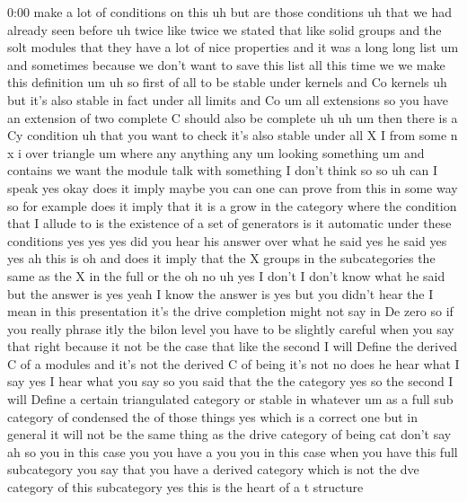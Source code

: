\begin{unfinished}{0:00}
make  a  lot  of  conditions  on  this  uh  but
are  those  conditions  uh  that  we  had
already  seen  before  uh  twice  like  twice
we  stated  that  like  solid  groups  and  the
solt  modules  that  they  have  a  lot  of
nice  properties  and  it  was  a  long  long
list  um  and  sometimes  because  we  don't
want  to  save  this  list  all  this  time  we
we  make  this  definition
um  uh  so  first  of  all  to
be  stable  under  kernels  and  Co
kernels  uh  but  it's  also  stable  in  fact
under  all  limits  and
Co  um  all  extensions  so  you  have  an
extension  of  two  complete  C  should  also
be
complete  uh
uh
um  then  there  is  a  Cy  condition  uh
that  you  want  to  check  it's  also  stable
under
all  X  I  from  some
n  x  i  over  triangle  um  where  any
anything
any
um  looking  something  um  and
contains  we  want
the  module
talk  with
something  I  don't  think
so  so  uh  can  I  speak  yes  okay  does  it
imply  maybe  you  can  one  can  prove  from
this  in  some  way  so  for  example  does  it
imply  that  it  is  a  grow  in  the  category
where  the  condition  that  I  allude  to  is
the  existence  of  a  set  of  generators  is
it  automatic  under  these  conditions  yes
yes
yes  did  you  hear  his  answer  over  what  he
said  yes  he  said  yes  yes  ah  this
is  oh  and  does  it  imply  that  the  X
groups  in  the  subcategories  the  same  as
the  X  in  the  full  or  the  oh  no
uh  yes  I  don't  I  don't  know  what  he  said
but  the  answer  is  yes  yeah  I  know  the
answer  is  yes  but  you  didn't  hear  the  I
mean  in  this  presentation  it's  the  drive
completion  might  not  say  in  De  zero  so
if  you  really  phrase  itly  the  bilon
level  you  have  to  be  slightly  careful
when  you  say  that  right  because  it  not
be  the  case  that  like  the  second  I  will
Define  the  derived  C  of  a  modules  and
it's  not  the  derived  C  of
being  it's
not  no  does  he  hear  what  I  say  yes  I
hear  what  you  say  so  you  said  that  the
the  category  yes  so  the  second  I  will
Define  a  certain  triangulated  category
or  stable  in  whatever  um  as  a  full  sub
category  of  condensed  the  of  those
things  yes  which  is  a  correct  one  but  in
general  it  will  not  be  the  same  thing  as
the  drive  category  of  being  cat  don't
say  ah  so  you  in  this  case  you  you  have
a  you  you  in  this  case  when  you  have
this  full  subcategory  you  say  that  you
have  a  derived  category  which  is  not  the
dve  category  of  this
subcategory
yes  this  is  the  heart  of  a  t  structure

\end{unfinished}
